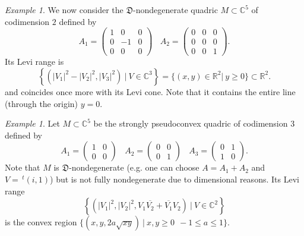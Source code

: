 \documentclass[12pt]{amsart}
\newcommand{\C}{\mathbb C}
\newcommand{\R}{\mathbb R}
\newcommand{\transp}{\,^t}
\theoremstyle{remark}
\theoremstyle{example}
\newtheorem{example}[theo]{Example}
\theoremstyle{definition}
\numberwithin{equation}{section}
\begin{document}
\begin{example}
We  now consider the $\mathfrak{D}$-nondegenerate quadric $M\subset \C^5$ of codimension $2$ defined by   
$$A_1=
\begin{pmatrix}
	1& 0 & 0 \\ 0 &-1 & 0 \\ 0 &0 & 0
\end{pmatrix} \ \ \ \ A_2=
\begin{pmatrix}
	0& 0 & 0 \\ 0 &0 & 0 \\ 0 &0 & 1
\end{pmatrix}.$$
Its Levi range is 
 $$\left\{\left(|V_1|^2-|V_2|^2,|V_3|^2\right) \ | \ V\in \C^3 \right\}=\{(x,y) \in \R^2 |  \ y\geq 0\}\subset \R^2.$$
 and coincides once more with its Levi cone. Note that it contains the entire line (through the origin) $y=0$.  
\end{example}    

\begin{example}\label{exrank}
Let $M\subset \C^5$ be the strongly pseudoconvex quadric of codimension $3$ defined by   
$$A_1=
\begin{pmatrix}
	1& 0 \\ 0 &0 
\end{pmatrix} \ \ \ \ 
A_2=
\begin{pmatrix}
	0& 0 \\ 0 &1 
\end{pmatrix}\ \ \ \ 
A_3=
\begin{pmatrix}
	0& 1 \\ 1 &0 
\end{pmatrix}.$$
Note that $M$ is $\mathfrak{D}$-nondegenerate (e.g. one can choose $A=A_1+A_2$ and $V=\transp(i,1)$) but is not fully nondegenerate due to dimensional reasons.
Its Levi range
 $$\left\{\left(|V_1|^2,|V_2|^2,V_1\overline{V_2}+\overline{V_1}V_2\right) \ | \ V\in \C^2 \right\}$$ 
 is the convex region $\{(x,y,2a\sqrt{xy}) \ | \ x,y\geq 0 \ \  -1\leq a \leq 1\}$. 
\end{example} 
\end{document}
